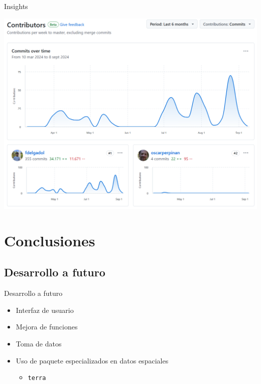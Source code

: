 \documentclass[aspectratio=169, usenames,svgnames,dvipsnames]{beamer}
\begin{document}
\begin{frame}[label={sec:org284cc84}]{Insights}
\begin{center}
\includegraphics[height=0.9\textheight]{../figuras/contributors.png}
\end{center}
\end{frame}
\section{Conclusiones}
\label{sec:org45ab449}
\subsection{Desarrollo a futuro}
\label{sec:org462962c}
\begin{frame}[label={sec:orgade0ad6},fragile]{Desarrollo a futuro}
 \begin{itemize}
\item Interfaz de usuario

\item Mejora de funciones

\item Toma de datos

\item Uso de paquete especializados en datos espaciales
\begin{itemize}
\item \texttt{terra}
\end{itemize}
\end{itemize}
\end{frame}
\end{document}
